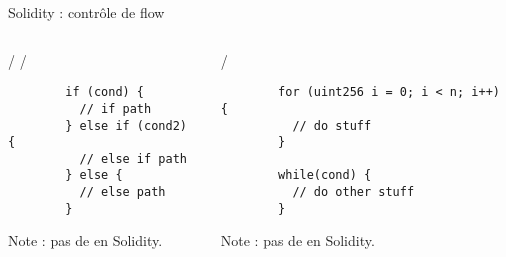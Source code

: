 \begin{frame}[fragile]{Solidity : contrôle de flow}
  \begin{columns}
    \begin{column}{0.47\textwidth}
       /  / 

      \begin{verbatim}
        if (cond) {
          // if path
        } else if (cond2) {
          // else if path
        } else {
          // else path
        }
      \end{verbatim}

      Note : pas de  en Solidity.
    \end{column}
    \vspace{0.03\textwidth}
    \begin{column}{0.47\textwidth}
       / 

      \begin{verbatim}
        for (uint256 i = 0; i < n; i++) {
          // do stuff
        }

        while(cond) {
          // do other stuff
        }
      \end{verbatim}

      Note : pas de  en Solidity.
    \end{column}
  \end{columns}
\end{frame}

